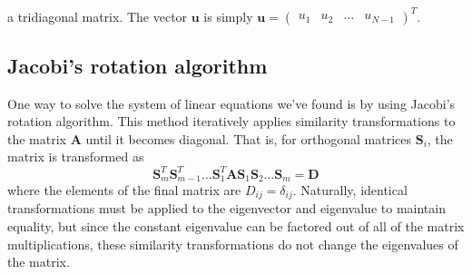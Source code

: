 \documentclass[aps,prc,reprint]{revtex4-1}
\begin{document}
    a tridiagonal matrix. The vector $\mathbf{u}$ is simply $\mathbf{u} = \begin{pmatrix}u_1 & u_2 & \dots & u_{N-1}\end{pmatrix}^T$.

    \subsection{Jacobi's rotation algorithm}
    \label{sub:jacobi}
        One way to solve the system of linear equations we've found is by using Jacobi's rotation algorithm. This method iteratively applies similarity transformations to the matrix $\mathbf{A}$ until it becomes diagonal. That is, for orthogonal matrices $\mathbf{S}_i$, the matrix is transformed as
        \begin{equation*}
            \mathbf{S}_m^T \mathbf{S}_{m-1}^T \dots \mathbf{S}_{1}^T \mathbf{A} \mathbf{S}_{1} \mathbf{S}_{2} \dots \mathbf{S}_{m} = \mathbf{D}
        \end{equation*}
        where the elements of the final matrix are $D_{ij} = \delta_{ij}$. Naturally, identical transformations must be applied to the eigenvector and eigenvalue to maintain equality, but since the constant eigenvalue can be factored out of all of the matrix multiplications, these similarity transformations do not change the eigenvalues of the matrix.
\end{document}
